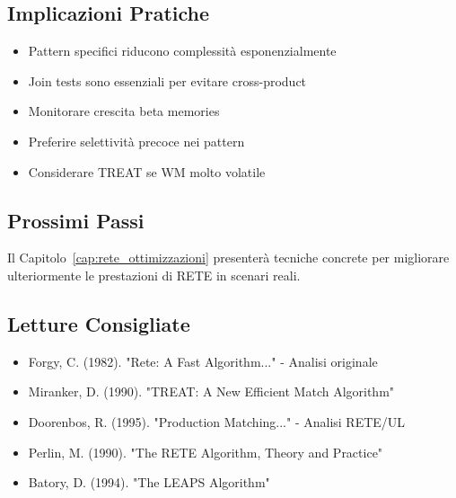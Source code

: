 \subsection{Implicazioni Pratiche}

\begin{infobox}
\begin{itemize}
\item Pattern specifici riducono complessità esponenzialmente
\item Join tests sono essenziali per evitare cross-product
\item Monitorare crescita beta memories
\item Preferire selettività precoce nei pattern
\item Considerare TREAT se WM molto volatile
\end{itemize}
\end{infobox}

\subsection{Prossimi Passi}

Il Capitolo~\ref{cap:rete_ottimizzazioni} presenterà tecniche concrete per migliorare ulteriormente le prestazioni di RETE in scenari reali.

\subsection{Letture Consigliate}

\begin{itemize}
\item Forgy, C. (1982). "Rete: A Fast Algorithm..." - Analisi originale
\item Miranker, D. (1990). "TREAT: A New Efficient Match Algorithm"
\item Doorenbos, R. (1995). "Production Matching..." - Analisi RETE/UL
\item Perlin, M. (1990). "The RETE Algorithm, Theory and Practice"
\item Batory, D. (1994). "The LEAPS Algorithm"
\end{itemize}
